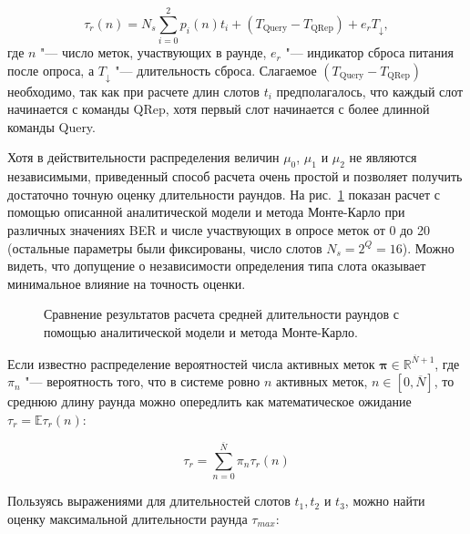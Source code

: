 \begin{equation}\label{eq:ch3_round_duration_of_n}
	\tau_r(n) = N_s \sum\limits_{i=0}^{2}p_i(n)t_i +
		(T_\text{Query} - T_\text{QRep}) +
		e_r T_\downarrow,
\end{equation}
где $n$ "--- число меток, участвующих в раунде, $e_r$ "--- индикатор сброса питания после опроса, а $T_\downarrow$ "--- длительность сброса. Слагаемое $(T_\text{Query} - T_\text{QRep})$ необходимо, так как при расчете длин слотов $t_i$ предполагалось, что каждый слот начинается с команды QRep, хотя первый слот начинается с более длинной команды Query.

Хотя в действительности распределения величин $\mu_0$, $\mu_1$ и $\mu_2$ не являются независимыми, приведенный способ расчета очень простой и позволяет получить достаточно точную оценку длительности раундов. На рис.~\ref{fig:ch3_round_durations_validation} показан расчет с помощью описанной аналитической модели и метода Монте-Карло при различных значениях BER и числе участвующих в опросе меток от 0 до 20 (остальные параметры были фиксированы, число слотов $N_s = 2^Q = 16$). Можно видеть, что допущение о независимости определения типа слота оказывает минимальное влияние на точность оценки.

\begin{figure}[htb]
  \caption[Валидация модели расчета средрней длительности раундов.]{Сравнение результатов расчета средней длительности раундов с помощью аналитической модели и метода Монте-Карло.}
  \label{fig:ch3_round_durations_validation}
\end{figure}


Если известно распределение вероятностей числа активных меток $\bm{\pi} \in \mathbb{R}^{\overline{N}+1}$, где $\pi_n$ "--- вероятность того, что в системе ровно $n$ активных меток, $n \in [0, \overline{N}]$, то среднюю длину раунда можно опередлить как математическое ожидание $\tau_r = \mathbb{E} \tau_r(n)$:

\begin{equation}\label{eq:ch3_round_duration_avg}
	\tau_r = \sum\limits_{n=0}^{\overline{N}} \pi_n \tau_r(n)
\end{equation}

Пользуясь выражениями для длительностей слотов $t_1, t_2$ и $t_3$, можно найти оценку максимальной длительности раунда $\tau_{max}$:


